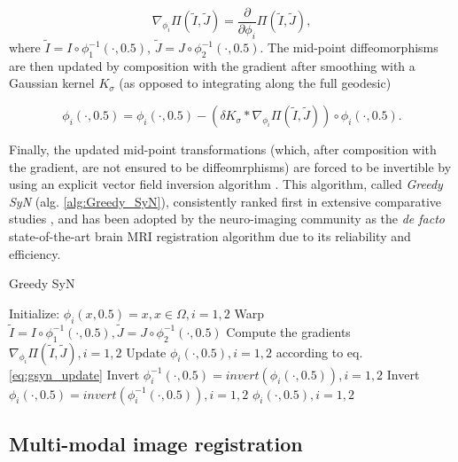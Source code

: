 \begin{equation}\label{eq:grad_metric}
    \nabla_{\phi_{i}} \Pi(\tilde{I}, \tilde{J}) = \frac{\partial}{\partial \phi_{i}} \Pi \left( \tilde{I}, \tilde{J}\right),
\end{equation}
where $\tilde{I} = I \circ \phi_{1}^{-1}(\cdot, 0.5)$, $\tilde{J} = J \circ \phi_{2}^{-1}(\cdot, 0.5)$. The mid-point diffeomorphisms are then updated by composition with
the gradient after smoothing with a Gaussian kernel $K_{\sigma}$ (as opposed to integrating along the full geodesic)

\begin{equation}\label{eq:gsyn_update}
    \phi_{i}(\cdot, 0.5) = \phi_{i}(\cdot, 0.5) - \left( \delta K_{\sigma} \ast \nabla_{\phi_{i}} \Pi(\tilde{I}, \tilde{J}) \right) \circ \phi_{i}(\cdot, 0.5).
\end{equation}

Finally, the updated mid-point transformations (which, after composition with the gradient, are not ensured to be diffeomrphisms) are forced to be invertible by using an
explicit vector field inversion algorithm \cite{Chen2008}. This algorithm, called \textit{Greedy SyN} (alg. \ref{alg:Greedy_SyN}), consistently ranked first in extensive comparative
studies \cite{Klein2009}\cite{Klein2010}\cite{Rohlfing2012}, and has been adopted by the neuro-imaging community as the \textit{de facto} state-of-the-art brain
MRI registration algorithm due to its reliability and efficiency.

\begin{algorithm}[h!]
\caption{Greedy SyN}\label{alg:Greedy_SyN}
\begin{algorithmic}[1]
\STATE Initialize: $\phi_{i}(x, 0.5) = x,  x\in\Omega, i=1, 2$
\REPEAT
    \STATE Warp $\tilde{I}  = I \circ \phi_{1}^{-1}(\cdot, 0.5), \tilde{J} = J \circ \phi_{2}^{-1}(\cdot, 0.5)$
    \STATE Compute the gradients $\nabla_{\phi_{i}} \Pi(\tilde{I}, \tilde{J}), i=1,2$
    \STATE Update $\phi_{i}(\cdot, 0.5), i=1, 2$ according to eq. \ref{eq:gsyn_update}
    \STATE Invert $\phi_{i}^{-1}(\cdot, 0.5) = invert (\phi_{i}(\cdot, 0.5)), i=1, 2$
    \STATE Invert $\phi_{i}(\cdot, 0.5) = invert (\phi_{i}^{-1}(\cdot, 0.5)), i=1, 2$
\RETURN $\phi_{i}(\cdot, 0.5), i=1,2$
\end{algorithmic}
\end{algorithm}

\subsection{Multi-modal image registration}

